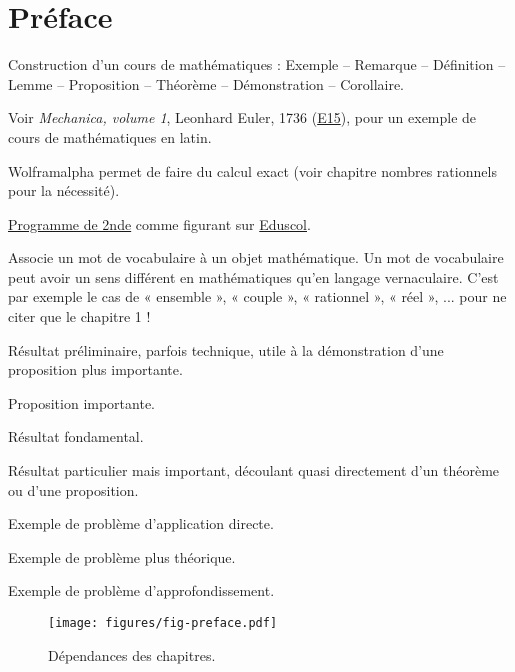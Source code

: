 
\chapter*{Préface}

Construction d'un cours de mathématiques : Exemple -- Remarque -- Définition -- Lemme -- Proposition -- Théorème -- Démonstration -- Corollaire.

Voir \emph{Mechanica, volume 1}, Leonhard Euler, 1736 (\href{https://scholarlycommons.pacific.edu/euler-works/15/}{E15}), pour un exemple de cours de mathématiques en latin.

Wolframalpha permet de faire du calcul exact (voir chapitre nombres rationnels pour la nécessité).

\href{https://eduscol.education.fr/document/41635/download}{Programme de 2nde} comme figurant sur 
\href{https://eduscol.education.fr/1723/programmes-et-ressources-en-mathematiques-voie-gt}{Eduscol}.

\begin{definition*}
Associe un mot de vocabulaire à un objet mathématique.
Un mot de vocabulaire peut avoir un sens différent en mathématiques qu'en langage vernaculaire.
C'est par exemple le cas de « ensemble », « couple », « rationnel », « réel », ... pour ne citer que le chapitre 1 !
\end{definition*}

\begin{lemme*}
	Résultat préliminaire, parfois technique, utile à la démonstration d'une proposition plus importante.
\end{lemme*}

\begin{proposition*}
	Proposition importante.
\end{proposition*}

\begin{theorem*}
	Résultat fondamental.
\end{theorem*}

\begin{corollaire*}
	Résultat particulier mais important, découlant quasi directement d'un théorème ou d'une proposition.
\end{corollaire*}

\begin{Exercise}[counter=preface]
	Exemple de problème d'application directe.
\end{Exercise}
\begin{Exercise}[difficulty=1, counter=preface]
	Exemple de problème plus théorique.
\end{Exercise}
\begin{Exercise}[difficulty=2, counter=preface]
	Exemple de problème d'approfondissement.
\end{Exercise}

\newpage
\begin{figure}
	\centering
	\texttt{[image: figures/fig-preface.pdf]}
	\caption{Dépendances des chapitres.}
\end{figure}
	